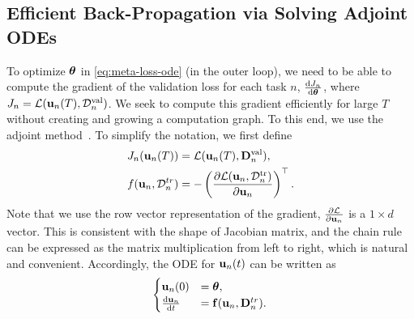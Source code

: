 \subsection{Efficient Back-Propagation via Solving Adjoint ODEs}
To optimize $\boldsymbol{\theta}$ in \eqref{eq:meta-loss-ode} (in the outer loop), we need to be able to compute the gradient of the  validation loss for each task $n$, \ie $\frac{{\rm d} J_n}{{\rm d} \boldsymbol{\theta}}$, where $J_n = \mathcal{L}({\bf u}_n(T), \mathcal{D}_n^{\text{val}})$. We seek to compute this gradient efficiently for large $T$ without creating and growing a computation graph.
To this end, we use the adjoint method~\citep{pontryagin1987mathematical}. 
To simplify the notation, we first define
\begin{align}
	J_n({\bf u}_n(T)) &= \mathcal{L}({\bf u}_n(T), {\bf D}_n^{\text{val}}), \notag \\
	f({\bf u}_n, \mathcal{D}_n^{tr}) &= -\left(\frac{\partial \mathcal{L}({\bf u}_n, \mathcal{D}_n^{\text{tr}})}{\partial {\bf u}_n}\right)^\top. \label{eq:def}
\end{align}
Note that we use the row vector representation of the gradient, \ie $\frac{\partial \mathcal{L}}{\partial {\bf u}_n}$ is a $1 \times d$ vector. This is consistent with the shape of Jacobian matrix, and the chain rule can be expressed as the matrix multiplication from left to right, which is natural and convenient. Accordingly, the ODE for ${\bf u}_n(t)$ can be written as 
\begin{equation}
	\begin{cases}
			{\bf u}_n(0) &= \boldsymbol{\theta},  \\
		\frac{{\rm d} {\bf u}_n}{{\rm d} t} &= {\bf f}({\bf u}_n, {\bf D}_n^{tr}). \label{eq:forward-ode}
	\end{cases}
\end{equation}

